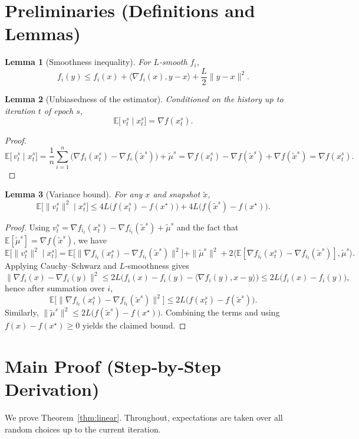 \documentclass{article}
\newtheorem{lemma}{Lemma}
\newcommand{\E}{\mathbb{E}}
\begin{document}
\section*{Preliminaries (Definitions and Lemmas)}
\begin{lemma}[Smoothness inequality]\label{lem:smooth}
For $L$‑smooth $f_i$,
\[
f_i(y)\le f_i(x)+\langle\nabla f_i(x),y-x\rangle+\frac{L}{2}\|y-x\|^{2}.
\]
\end{lemma}
\begin{lemma}[Unbiasedness of the estimator]\label{lem:unbiased}
Conditioned on the history up to iteration $t$ of epoch $s$,
\[
\E\!\bigl[\,v_{t}^{s}\mid x_{t}^{s}\bigr]=\nabla f(x_{t}^{s}).
\]
\end{lemma}
\begin{proof}
\[
\E\!\bigl[\,v_{t}^{s}\mid x_{t}^{s}\bigr]
= \frac{1}{n}\sum_{i=1}^{n}\bigl(\nabla f_i(x_{t}^{s})-\nabla f_i(\tilde{x}^{s})\bigr)+\tilde{\mu}^{s}
= \nabla f(x_{t}^{s})-\nabla f(\tilde{x}^{s})+\nabla f(\tilde{x}^{s})
= \nabla f(x_{t}^{s}).
\tag*{$\square$}
\]
\end{proof}
\begin{lemma}[Variance bound]\label{lem:variance}
For any $x$ and snapshot $\tilde{x}$,
\[
\E\!\bigl[\|v_{t}^{s}\|^{2}\mid x_{t}^{s}\bigr]
\le 4L\bigl(f(x_{t}^{s})-f(x^{\star})\bigr)
   +4L\bigl(f(\tilde{x}^{s})-f(x^{\star})\bigr).
\]
\end{lemma}
\begin{proof}
Using $v_{t}^{s}= \nabla f_{i_t}(x_{t}^{s})-\nabla f_{i_t}(\tilde{x}^{s})+\tilde{\mu}^{s}$ and the fact that $\E[\tilde{\mu}^{s}]=\nabla f(\tilde{x}^{s})$, we have
\[
\E\!\bigl[\|v_{t}^{s}\|^{2}\mid x_{t}^{s}\bigr]
= \E\!\bigl[\|\nabla f_{i_t}(x_{t}^{s})-\nabla f_{i_t}(\tilde{x}^{s})\|^{2}\bigr]
   +\|\tilde{\mu}^{s}\|^{2}
   +2\langle \E[\nabla f_{i_t}(x_{t}^{s})-\nabla f_{i_t}(\tilde{x}^{s})],\tilde{\mu}^{s}\rangle .
\]
Applying Cauchy–Schwarz and $L$‑smoothness gives
\[
\|\nabla f_{i}(x)-\nabla f_{i}(y)\|^{2}\le 2L\bigl(f_i(x)-f_i(y)-\langle\nabla f_i(y),x-y\rangle\bigr)
\le 2L\bigl(f_i(x)-f_i(y)\bigr),
\]
hence after summation over $i$,
\[
\E\!\bigl[\|\nabla f_{i_t}(x_{t}^{s})-\nabla f_{i_t}(\tilde{x}^{s})\|^{2}\bigr]
\le 2L\bigl(f(x_{t}^{s})-f(\tilde{x}^{s})\bigr).
\]
Similarly, $\|\tilde{\mu}^{s}\|^{2}\le 2L\bigl(f(\tilde{x}^{s})-f(x^{\star})\bigr)$. Combining the terms and using $f(x)-f(x^{\star})\ge0$ yields the claimed bound. \tag*{$\square$}
\end{proof}

\section*{Main Proof (Step‑by‑Step Derivation)}
We prove Theorem~\ref{thm:linear}.  Throughout, expectations are taken over all random choices up to the current iteration.
\end{document}
